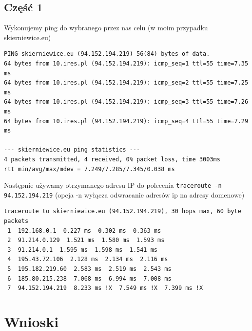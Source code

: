 \documentclass[11pt]{article}
\begin{document}
\subsection{Część 1}
\label{sec:org6e8a116}
Wykonujemy ping do wybranego przez nas celu (w moim przypadku skierniewice.eu)
\begin{verbatim}
PING skierniewice.eu (94.152.194.219) 56(84) bytes of data.
64 bytes from 10.ires.pl (94.152.194.219): icmp_seq=1 ttl=55 time=7.35 ms
64 bytes from 10.ires.pl (94.152.194.219): icmp_seq=2 ttl=55 time=7.25 ms
64 bytes from 10.ires.pl (94.152.194.219): icmp_seq=3 ttl=55 time=7.26 ms
64 bytes from 10.ires.pl (94.152.194.219): icmp_seq=4 ttl=55 time=7.29 ms

--- skierniewice.eu ping statistics ---
4 packets transmitted, 4 received, 0% packet loss, time 3003ms
rtt min/avg/max/mdev = 7.249/7.285/7.345/0.038 ms
\end{verbatim}
Następnie używamy otrzymanego adresu IP do polecenia \texttt{traceroute -n 94.152.194.219} (opcja -n wyłącza odwracanie adresów ip na adresy domenowe)
\begin{verbatim}
traceroute to skierniewice.eu (94.152.194.219), 30 hops max, 60 byte packets
 1  192.168.0.1  0.227 ms  0.302 ms  0.363 ms
 2  91.214.0.129  1.521 ms  1.580 ms  1.593 ms
 3  91.214.0.1  1.595 ms  1.598 ms  1.541 ms
 4  195.43.72.106  2.128 ms  2.134 ms  2.116 ms
 5  195.182.219.60  2.583 ms  2.519 ms  2.543 ms
 6  185.80.215.238  7.068 ms  6.994 ms  7.008 ms
 7  94.152.194.219  8.233 ms !X  7.549 ms !X  7.399 ms !X
\end{verbatim}


\section{Wnioski}
\label{sec:org58a0e15}
\end{document}
